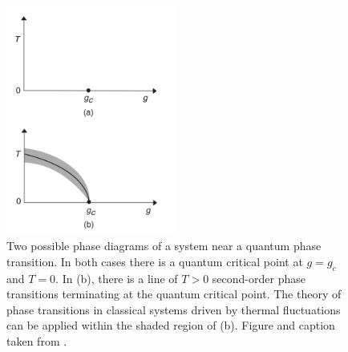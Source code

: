 \begin{figure}[!htbp]
  \center
  \includegraphics[width=0.5\textwidth]{Figuren/crit/Screenshot from 2021-05-06 15-58-55.png}
  \caption{ Two possible phase diagrams of a system near a quantum phase transition. In both cases there is a quantum critical point at $g = g_c$ and $T = 0$. In (b), there is a line of $T > 0$ second-order phase transitions terminating at the quantum critical point. The theory of phase transitions in classical systems driven by thermal fluctuations can be applied within the shaded region of (b).  Figure and caption taken from \cite{Sachdev1999}. }
  \label{fig:crit:qtran}
\end{figure}

